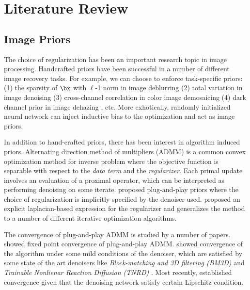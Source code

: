 \documentclass[11pt]{article}
\begin{document}
\section{Literature Review}


\subsection{Image Priors} 

The choice of regularization has been an important research topic in image processing. Handcrafted priors have been successful in a number of different image recovery tasks. For example, we can choose to enforce task-specific priors: (1) the sparsity of $\bx$ with $\ell$-1 norm in image deblurring \cite{beckFastIterativeShrinkageThresholding2009} (2) total variation in image denoising \cite{buadesNonlocalImageMovie2008} (3) cross-channel correlation in color image demosaicing \cite{malvarHighqualityLinearInterpolation2004} (4) dark channel prior in image dehazing \cite{fattalSingleImageDehazing2008}, etc. More exhotically, randomly initialized neural network can inject inductive bias to the optimization and act as image priors. \cite{ulyanovDeepImagePrior2017}

$ $\\
In addition to hand-crafted priors, there has been interest in algorithm induced priors. Alternating direction method of multipliers (ADMM) is a common convex optimization method for inverse problem where the objective function is separable with respect to the \textit{data term} and the \textit{regularizer}. Each primal update involves an evaluation of a proximal operator, which can be interpreted as performing denoising on some iterate. \cite{venkatakrishnanPlugandPlayPriorsModel2013,heideFlexISPFlexibleCamera2014,chanAlgorithmInducedPriorImage2016} proposed plug-and-play priors where the choice of regularization is implicitly specified by the denoiser used. \cite{romanoLittleEngineThat2016} proposed an explicit laplacian-based expression for the regularizer and generalizes the method to a number of different iterative optimization algorithms.

$ $\\
The convergence of plug-and-play ADMM is studied by a number of papers. \cite{chanPlugandPlayADMMImage2016} showed fixed point convergence of plug-and-play ADMM. \cite{romanoLittleEngineThat2016} showed convergence of the algorithm under some mild conditions of the denoiser, which are satisfied by some state of the art denoisers like \textit{Block-matching and 3D filtering
 (BM3D)} \cite{dabovImageDenoisingSparse2007} and \textit{Trainable Nonlienar Reaction Diffusion (TNRD)} \cite{chenTrainableNonlinearReaction2017}. Most recently, \cite{ryuPlugandPlayMethodsProvably2019} established convergence given that the denoising network satisfy certain Lipschitz condition.
\end{document}
